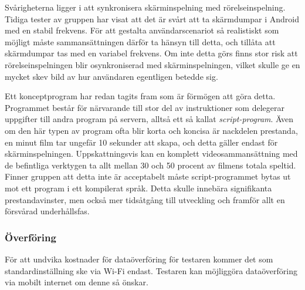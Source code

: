 Svårigheterna ligger i att synkronisera skärminspelning med rörelseinspelning. Tidiga tester av gruppen har visat att det är svårt att ta skärmdumpar i Android med en stabil frekvens. För att gestalta användarscenariot så realistiskt som möjligt måste sammansättningen därför ta hänsyn till detta, och tillåta att skärmdumpar tas med en variabel frekvens. Om inte detta görs finns stor risk att rörelseinspelningen blir osynkroniserad med skärminspelningen, vilket skulle ge en mycket skev bild av hur användaren egentligen betedde sig.

Ett konceptprogram har redan tagits fram som är förmögen att göra detta. Programmet består för närvarande till stor del av instruktioner som delegerar uppgifter till andra program på servern, alltså ett så kallat \textit{script-program}. Även om den här typen av program ofta blir korta och koncisa är nackdelen prestanda, en minut film tar ungefär 10 sekunder att skapa, och detta gäller endast för skärminspelningen. Uppskattningsvis kan en komplett videosammansättning med de befintliga verktygen ta allt mellan 30 och 50 procent av filmens totala speltid. Finner gruppen att detta inte är acceptabelt måste script-programmet bytas ut mot ett program i ett kompilerat språk. Detta skulle innebära signifikanta prestandavinster, men också mer tidsåtgång till utveckling och framför allt en försvårad underhållsfas.

\subsubsection{Överföring}
För att undvika kostnader för dataöverföring för testaren kommer det som standardinställning ske via Wi-Fi endast. Testaren kan möjliggöra dataöverföring via mobilt internet om denne så önskar.
